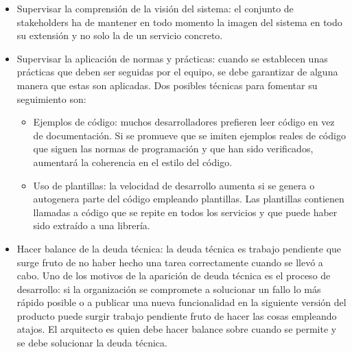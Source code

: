 \documentclass[11pt,a4paper]{article}
\begin{document}
\begin{itemize}

\item Supervisar la comprensión de la visión del sistema: el conjunto de stakeholders ha de mantener en todo momento la imagen del sistema en todo su extensión y no solo la de un servicio concreto.

\item Supervisar la aplicación de normas y prácticas: cuando se establecen unas prácticas que deben ser seguidas por el equipo, se debe garantizar de alguna manera que estas son aplicadas. Dos posibles técnicas para fomentar su seguimiento son:

\begin{itemize}

\item Ejemplos de código: muchos desarrolladores prefieren leer código en vez de documentación. Si se promueve que se imiten ejemplos reales de código que siguen las normas de programación y que han sido verificados, aumentará la coherencia en el estilo del código.

\item Uso de plantillas:  la velocidad de desarrollo aumenta si se genera o autogenera parte del código empleando plantillas. Las plantillas contienen llamadas a código que se repite en todos los servicios y que puede haber sido extraído a una librería.

\end{itemize}

\item Hacer balance de la deuda técnica: la deuda técnica es trabajo pendiente que surge fruto de no haber hecho una tarea correctamente cuando se llevó a cabo. Uno de los motivos de la aparición de deuda técnica es el proceso de desarrollo: si la organización se compromete a solucionar un fallo lo más rápido posible o a publicar una nueva funcionalidad en la siguiente versión del producto puede surgir trabajo pendiente fruto de hacer las cosas empleando atajos. El arquitecto es quien debe hacer balance sobre cuando se permite y se debe solucionar la deuda técnica.

\end{itemize}
\end{document}
